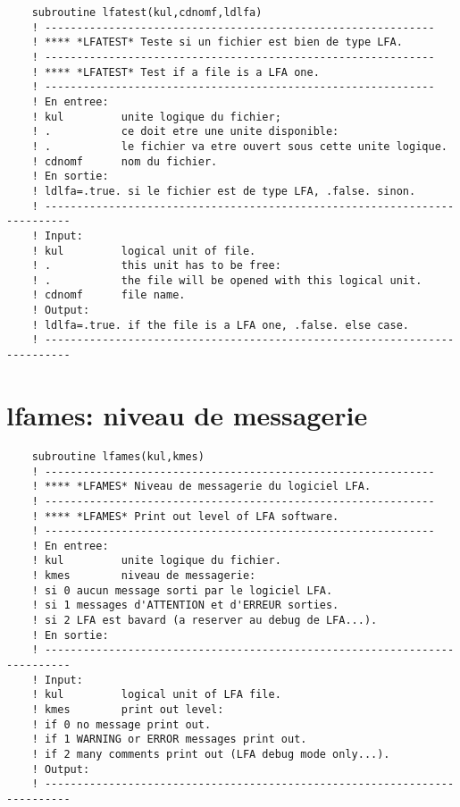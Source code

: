\documentclass[10pt,french]{book}
\begin{document}
 
 
\begin{verbatim}
	subroutine lfatest(kul,cdnomf,ldlfa)
	! -------------------------------------------------------------                
	! **** *LFATEST* Teste si un fichier est bien de type LFA.
	! -------------------------------------------------------------                
	! **** *LFATEST* Test if a file is a LFA one.
	! -------------------------------------------------------------                
	! En entree:
	! kul         unite logique du fichier;
	! .           ce doit etre une unite disponible:
	! .           le fichier va etre ouvert sous cette unite logique.
	! cdnomf      nom du fichier.
	! En sortie:
	! ldlfa=.true. si le fichier est de type LFA, .false. sinon.
	! --------------------------------------------------------------------------
	! Input:
	! kul         logical unit of file.
	! .           this unit has to be free:
	! .           the file will be opened with this logical unit.
	! cdnomf      file name.
	! Output:
	! ldlfa=.true. if the file is a LFA one, .false. else case.
	! --------------------------------------------------------------------------
\end{verbatim}
 
\section{lfames: niveau de messagerie}
 
 
 
\begin{verbatim}
	subroutine lfames(kul,kmes)
	! -------------------------------------------------------------                
	! **** *LFAMES* Niveau de messagerie du logiciel LFA.
	! -------------------------------------------------------------                
	! **** *LFAMES* Print out level of LFA software.
	! -------------------------------------------------------------                
	! En entree:
	! kul         unite logique du fichier.
	! kmes        niveau de messagerie:
	! si 0 aucun message sorti par le logiciel LFA.
	! si 1 messages d'ATTENTION et d'ERREUR sorties.
	! si 2 LFA est bavard (a reserver au debug de LFA...).
	! En sortie:
	! --------------------------------------------------------------------------
	! Input:
	! kul         logical unit of LFA file.
	! kmes        print out level:
	! if 0 no message print out.
	! if 1 WARNING or ERROR messages print out.
	! if 2 many comments print out (LFA debug mode only...).
	! Output:
	! --------------------------------------------------------------------------
\end{verbatim}
 
\end{document}
